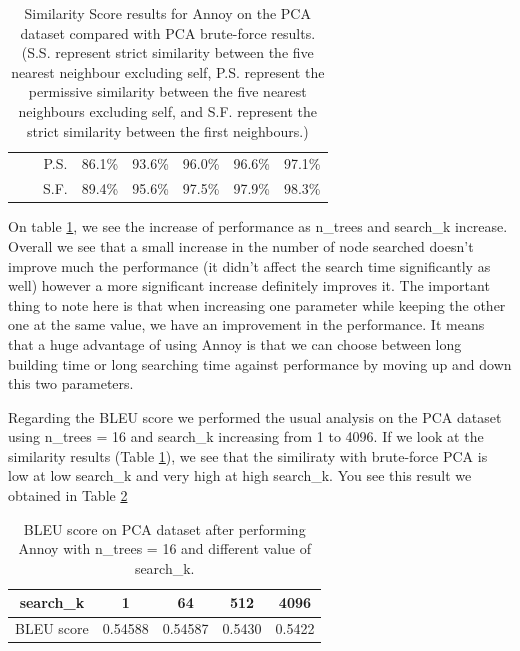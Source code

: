 \documentclass[a4paper]{article}
\begin{document}
\begin{table}[h]
\begin{tabular}{ c  c  c | c | c | c | c | c |}
		\cline{3-8}
		\multicolumn{1}{|c|}{} & \multicolumn{1}{|c|}{} & P.S. & 86.1\% & 93.6\% & 96.0\% & 96.6\% & 97.1\% \\
		\cline{3-8}
		\multicolumn{1}{|c|}{} & \multicolumn{1}{|c|}{} & S.F. & 89.4\% & 95.6\% & 97.5\% & 97.9\% & 98.3\% \\
		\cline{1-8}
	\end{tabular}
	\caption{Similarity Score results for Annoy on the PCA dataset compared with PCA brute-force results. (S.S. represent strict similarity between the five nearest neighbour excluding self, P.S. represent the permissive similarity between the five nearest neighbours excluding self, and S.F. represent the strict similarity between the first neighbours.)}
	\label{table:benchmark-sim-annoy}
\end{table}

On table \ref{table:benchmark-sim-annoy}, we see the increase of performance as n\_trees and search\_k increase. Overall we see that a small increase in the number of node searched doesn't improve much the performance (it didn't affect the search time significantly as well) however a more significant increase definitely improves it. The important thing to note here is that when increasing one parameter while keeping the other one at the same value, we have an improvement in the performance. It means that a huge advantage of using Annoy is that we can choose between long building time or long searching time against performance by moving up and down this two parameters.

Regarding the BLEU score we performed the usual analysis on the PCA dataset using n\_trees = 16 and search\_k increasing from 1 to 4096. If we look at the similarity results (Table \ref{table:benchmark-sim-annoy}), we see that the similiraty with brute-force PCA is low at low search\_k and very high at high search\_k. You see this result we obtained in Table \ref{table:bleu-annoy}

	\begin{table}[h]
		\centering
		\begin{tabular}{ | c | c | c | c | c |}
		\hline
			search\_k & 1 & 64 & 512 & 4096 \\ \hline
			BLEU score & 0.54588 & 0.54587 & 0.5430 & 0.5422 \\ \hline
			
		\end{tabular}
		\caption{BLEU score on PCA dataset after performing Annoy with n\_trees = 16 and different value of search\_k.}
		\label{table:bleu-annoy}
	\end{table}
	
\end{document}
